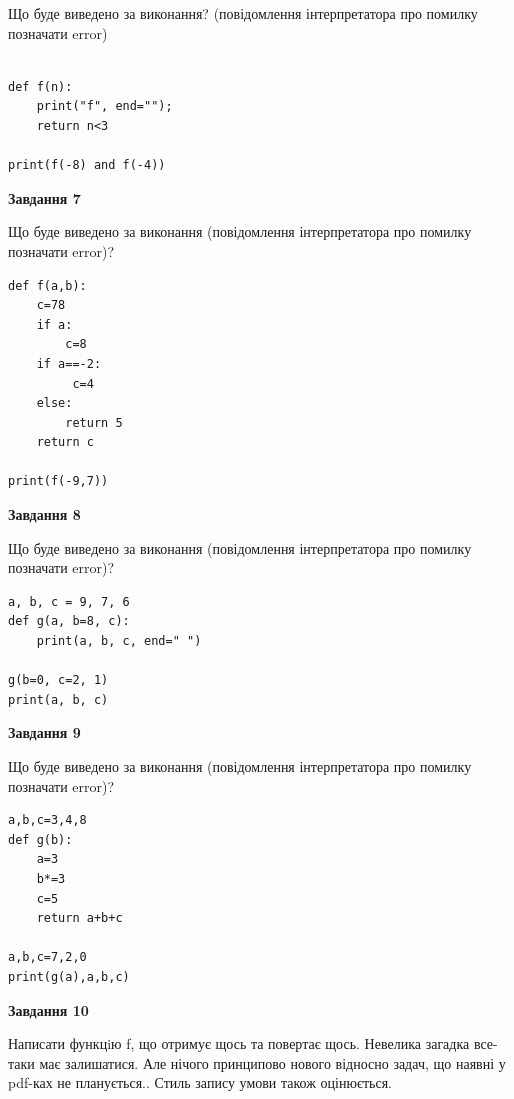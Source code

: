 \documentclass[12pt, ukrainian]{article}
\begin{document}
{\begin {large}
Що буде виведено за виконання? (повідомлення інтерпретатора про помилку позначати error)\par
\begin{verbatim}

def f(n):
    print("f", end="");
    return n<3

print(f(-8) and f(-4))
\end{verbatim}

{\begin {center}\textbf{Завдання 7}\end {center}}

Що буде виведено за виконання (повідомлення інтерпретатора про помилку позначати error)?\par
\begin{verbatim}
def f(a,b):
    c=78
    if a:
        c=8
    if a==-2:
         c=4
    else: 
        return 5
    return c

print(f(-9,7))
\end{verbatim}

{\begin {center}\textbf{Завдання 8}\end {center}}

Що буде виведено за виконання (повідомлення інтерпретатора про помилку позначати error)?\par
\begin{verbatim}
a, b, c = 9, 7, 6
def g(a, b=8, c):
    print(a, b, c, end=" ")

g(b=0, c=2, 1)
print(a, b, c)
\end{verbatim}

{\begin {center}\textbf{Завдання 9}\end {center}}

Що буде виведено за виконання (повідомлення інтерпретатора про помилку позначати error)?\par
\begin{verbatim}
a,b,c=3,4,8
def g(b):
    a=3
    b*=3
    c=5
    return a+b+c

a,b,c=7,2,0
print(g(a),a,b,c)
\end{verbatim}

{\begin {center}\textbf{Завдання 10}\end {center}}


Написати функцiю f, що отримує щось та повертає щось. Невелика загадка все-таки має залишатися. Але нічого принципово нового відносно задач, що наявні у pdf-ках не планується.. Стиль запису умови також оцінюється.\par
\end {large}}
\newpage
\end{document}
